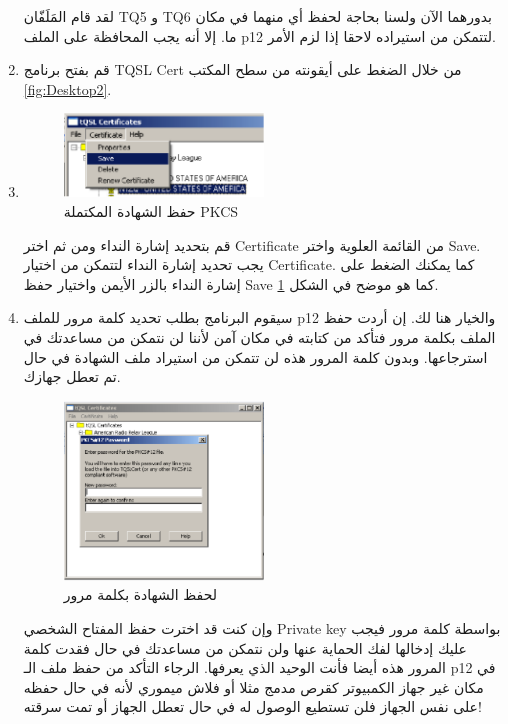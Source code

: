 \documentclass[a4paper,12pt]{article}
\begin{document}
\begin{enumerate}
لقد قام المَلَفّان \textenglish{TQ5} و \textenglish{TQ6} بدورهما الآن ولسنا بحاجة لحفظ أي منهما في مكان
ما. إلا أنه يجب المحافظة على الملف p12 لتتمكن من استيراده لاحقا إذا لزم
الأمر.


		\item
			  قم بفتح برنامج \textenglish{TQSL Cert} من خلال الضغط على أيقونته من سطح المكتب \ref{fig:Desktop2}.
		\item
		\begin{figure}[!hbtp]
		\centering
		\includegraphics[width=0.5\textwidth]{savepkcs.eps}
		\caption{حفظ الشهادة المكتملة \textenglish{PKCS}}
		\label{fig:SavePKCS}
		\end{figure}
			قم بتحديد إشارة النداء ومن ثم اختر \textenglish{Certificate} من القائمة العلوية واختر \textenglish{Save}. يجب تحديد إشارة النداء لتتمكن من اختيار \textenglish{Certificate}. كما يمكنك الضغط على إشارة النداء بالزر الأيمن واختيار حفظ \textenglish{Save} كما هو موضح في الشكل \ref{fig:SavePKCS}.
		\item
			  سيقوم البرنامج بطلب تحديد كلمة مرور للملف \textenglish{p12} والخيار هنا لك. إن أردت
			  حفظ الملف بكلمة مرور فتأكد من كتابته في مكان آمن لأننا لن نتمكن من
			  مساعدتك في استرجاعها. وبدون كلمة المرور هذه لن تتمكن من استيراد ملف
			  الشهادة في حال تم تعطل جهازك.

	  		\begin{figure}[!hbtp]
	  		\centering
	  		\includegraphics[width=0.5\textwidth]{pkcspassword.eps}
	  		\caption{لحفظ الشهادة بكلمة مرور}
	  		\label{fig:PKCSPassword}
	  		\end{figure}

			   وإن كنت قد اخترت حفظ المفتاح الشخصي
			  \textenglish{Private key} بواسطة كلمة مرور فيجب عليك إدخالها لفك الحماية عنها ولن
			  نتمكن من مساعدتك في حال فقدت كلمة المرور هذه أيضا فأنت الوحيد الذي
			  يعرفها. الرجاء التأكد من حفظ ملف الـ \textenglish{p12} في مكان غير جهاز الكمبيوتر
			  كقرص مدمج مثلا أو فلاش ميموري لأنه في حال حفظه على نفس الجهاز فلن
			  تستطيع الوصول له في حال تعطل الجهاز أو تمت سرقته!
	\end{enumerate}
	
\end{document}

